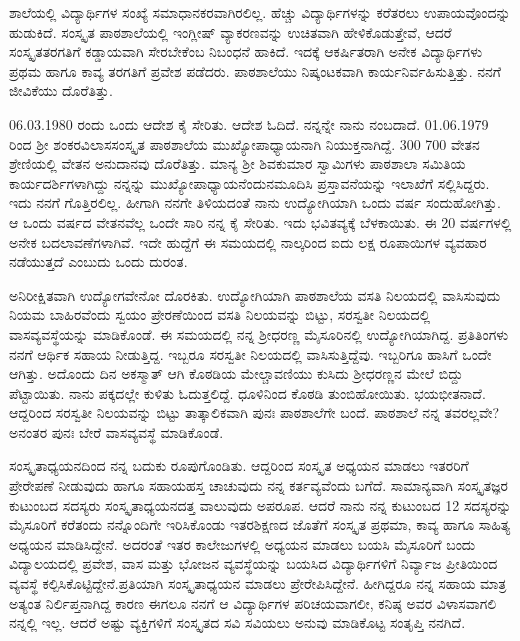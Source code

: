 {ಶಾಲೆಯಲ್ಲಿ ವಿದ್ಯಾರ್ಥಿಗಳ ಸಂಖ್ಯೆ ಸಮಾಧಾನಕರವಾಗಿರಲಿಲ್ಲ.  ಹೆಚ್ಚು ವಿದ್ಯಾರ್ಥಿ\-ಗಳನ್ನು ಕರೆತರಲು ಉಪಾಯವೊಂದನ್ನು ಹುಡುಕಿದೆ.  ಸಂಸ್ಕೃತ ಪಾಠಶಾಲೆಯಲ್ಲಿ ಇಂಗ್ಲೀಷ್ ವ್ಯಾಕರಣವನ್ನು ಉಚಿತವಾಗಿ ಹೇಳಿಕೊಡುತ್ತೇವೆ, ಆದರೆ ಸಂಸ್ಕೃತ\break ತರಗತಿಗೆ ಕಡ್ಡಾಯವಾಗಿ ಸೇರಬೇಕೆಂಬ ನಿಬಂಧನೆ ಹಾಕಿದೆ.    ಇದಕ್ಕೆ ಆಕರ್ಷಿತರಾಗಿ ಅನೇಕ ವಿದ್ಯಾರ್ಥಿಗಳು ಪ್ರಥಮ ಹಾಗೂ ಕಾವ್ಯ ತರಗತಿಗೆ ಪ್ರವೇಶ ಪಡೆದರು.  ಪಾಠಶಾಲೆಯು ನಿಷ್ಕಂಟಕವಾಗಿ ಕಾರ್ಯನಿರ್ವಹಿಸುತ್ತಿತ್ತು.  ನನಗೆ ಜೀವಿಕೆಯು ದೊರೆತಿತ್ತು.  

06.03.1980 ರಂದು ಒಂದು ಆದೇಶ ಕೈ ಸೇರಿತು.  ಆದೇಶ ಓದಿದೆ.  ನನ್ನನ್ನೇ ನಾನು ನಂಬದಾದೆ.  01.06.1979 ರಿಂದ ಶ್ರೀ ಶಂಕರವಿಲಾಸಸಂಸ್ಕೃತ ಪಾಠಶಾಲೆಯ ಮುಖ್ಯೋಪಾಧ್ಯಾಯನಾಗಿ ನಿಯುಕ್ತನಾಗಿದ್ದೆ.  300  \enginline{-}  700 ವೇತನ ಶ್ರೇಣಿಯಲ್ಲಿ ವೇತನ ಅನುದಾನವು ದೊರೆತಿತ್ತು.  ಮಾನ್ಯ ಶ್ರೀ ಶಿವಕುಮಾರ ಸ್ವಾಮಿಗಳು ಪಾಠಶಾಲಾ ಸಮಿತಿಯ ಕಾರ್ಯದರ್ಶಿಗಳಾಗಿದ್ದು ನನ್ನನ್ನು ಮುಖ್ಯೋಪಾಧ್ಯಾಯನೆಂದು\break  ನಮೂದಿಸಿ ಪ್ರಸ್ತಾವನೆಯನ್ನು ಇಲಾಖೆಗೆ ಸಲ್ಲಿಸಿದ್ದರು.  ಇದು ನನಗೆ ಗೊತ್ತಿರಲಿಲ್ಲ. ಹೀಗಾಗಿ ನನಗೇ ತಿಳಿಯದಂತೆ ನಾನು ಉದ್ಯೋಗಿಯಾಗಿ ಒಂದು ವರ್ಷ ಸಂದು\break ಹೋಗಿತ್ತು.  ಆ ಒಂದು ವರ್ಷದ ವೇತನವೆಲ್ಲ ಒಂದೇ ಸಾರಿ ನನ್ನ ಕೈ ಸೇರಿತು.  ಇದು ಭವಿತವ್ಯಕ್ಕೆ ಬೆಳಕಾಯಿತು.  ಈ 20 ವರ್ಷಗಳಲ್ಲಿ ಅನೇಕ ಬದಲಾವಣೆಗಳಾಗಿವೆ.  ಇದೇ ಹುದ್ದೆಗೆ ಈ ಸಮಯದಲ್ಲಿ ನಾಲ್ಕರಿಂದ ಐದು ಲಕ್ಷ ರೂಪಾಯಿಗಳ ವ್ಯವಹಾರ ನಡೆಯುತ್ತದೆ ಎಂಬುದು ಒಂದು ದುರಂತ.  

ಅನಿರೀಕ್ಷಿತವಾಗಿ ಉದ್ಯೋಗವೇನೋ ದೊರಕಿತು.  ಉದ್ಯೋಗಿಯಾಗಿ ಪಾಠ\-\break ಶಾಲೆಯ ವಸತಿ ನಿಲಯದಲ್ಲಿ ವಾಸಿಸುವುದು ನಿಯಮ ಬಾಹಿರವೆಂದು ಸ್ವಯಂ ಪ್ರೇರಣೆಯಿಂದ ವಸತಿ ನಿಲಯವನ್ನು ಬಿಟ್ಟು, ಸರಸ್ವತೀ ನಿಲಯದಲ್ಲಿ ವಾಸವ್ಯವಸ್ಥೆಯನ್ನು ಮಾಡಿಕೊಂಡೆ. ಈ ಸಮಯದಲ್ಲಿ ನನ್ನ ಶ್ರೀಧರಣ್ಣ ಮೈಸೂರಿನಲ್ಲಿ ಉದ್ಯೋಗಿಯಾಗಿದ್ದ.  ಪ್ರತಿತಿಂಗಳು ನನಗೆ ಆರ್ಥಿಕ ಸಹಾಯ ನೀಡುತ್ತಿದ್ದ.  ಇಬ್ಬರೂ ಸರಸ್ವತೀ ನಿಲಯದಲ್ಲಿ ವಾಸಿಸುತ್ತಿದ್ದೆವು.  ಇಬ್ಬರಿಗೂ ಹಾಸಿಗೆ ಒಂದೇ ಆಗಿತ್ತು.  ಅದೊಂದು ದಿನ ಅಕಸ್ಮಾತ್ ಆಗಿ ಕೊಠಡಿಯ ಮೇಲ್ಚಾವಣಿಯು ಕುಸಿದು ಶ್ರೀಧರಣ್ಣನ ಮೇಲೆ ಬಿದ್ದು ಪೆಟ್ಟಾಯಿತು. ನಾನು ಪಕ್ಕದಲ್ಲೇ ಕುಳಿತು ಓದುತ್ತಲಿದ್ದೆ.  ಧೂಳಿನಿಂದ ಕೊಠಡಿ ತುಂಬಿಹೋಯಿತು. ಭಯಭೀತನಾದೆ. ಆದ್ದರಿಂದ ಸರಸ್ವತೀ ನಿಲಯವನ್ನು ಬಿಟ್ಟು ತಾತ್ಕಾಲಿಕವಾಗಿ ಪುನಃ ಪಾಠಶಾಲೆಗೇ ಬಂದೆ. ಪಾಠಶಾಲೆ ನನ್ನ ತವರಲ್ಲವೇ? ಅನಂತರ ಪುನಃ ಬೇರೆ ವಾಸವ್ಯವಸ್ಥೆ ಮಾಡಿಕೊಂಡೆ. 

ಸಂಸ್ಕೃತಾಧ್ಯಯನದಿಂದ ನನ್ನ ಬದುಕು ರೂಪುಗೊಂಡಿತು.  ಆದ್ದರಿಂದ ಸಂಸ್ಕೃತ ಅಧ್ಯಯನ ಮಾಡಲು ಇತರರಿಗೆ ಪ್ರೇರೇಪಣೆ ನೀಡುವುದು ಹಾಗೂ ಸಹಾಯಹಸ್ತ ಚಾಚುವುದು ನನ್ನ ಕರ್ತವ್ಯವೆಂದು ಬಗೆದೆ.  ಸಾಮಾನ್ಯವಾಗಿ  ಸಂಸ್ಕೃತಜ್ಞರ \hbox{ಕುಟುಂಬದ} ಸದಸ್ಯರು ಸಂಸ್ಕೃತಾಧ್ಯಯನದತ್ತ ವಾಲುವುದು ಅಪರೂಪ.  ಆದರೆ ನಾನು ನನ್ನ \hbox{ಕುಟುಂಬದ} 12 ಸದಸ್ಯರನ್ನು ಮೈಸೂರಿಗೆ ಕರೆತಂದು ನನ್ನೊಂದಿಗೇ ಇರಿಸಿಕೊಂಡು ಇತರ\break ಶಿಕ್ಷಣದ ಜೊತೆಗೆ ಸಂಸ್ಕೃತ ಪ್ರಥಮಾ, ಕಾವ್ಯ ಹಾಗೂ ಸಾಹಿತ್ಯ ಅಧ್ಯಯನ ಮಾಡಿಸಿದ್ದೇನೆ.  ಅದರಂತೆ ಇತರ ಕಾಲೇಜುಗಳಲ್ಲಿ ಅಧ್ಯಯನ ಮಾಡಲು ಬಯಸಿ ಮೈಸೂರಿಗೆ ಬಂದು ವಿದ್ಯಾಲಯದಲ್ಲಿ ಪ್ರವೇಶ, ವಾಸ ಮತ್ತು ಭೋಜನ ವ್ಯವಸ್ಥೆಯನ್ನು ಬಯಸಿದ ವಿದ್ಯಾರ್ಥಿಗಳಿಗೆ ನಿರ್ವ್ಯಾಜ ಪ್ರೀತಿಯಿಂದ ವ್ಯವಸ್ಥೆ ಕಲ್ಪಿಸಿಕೊಟ್ಟಿದ್ದೇನೆ.\break  ಪ್ರತಿಯಾಗಿ ಸಂಸ್ಕೃತಾಧ್ಯಯನ ಮಾಡಲು ಪ್ರೇರೇಪಿಸಿದ್ದೇನೆ.  ಹೀಗಿದ್ದರೂ ನನ್ನ ಸಹಾಯ ಮಾತ್ರ ಅತ್ಯಂತ ನಿರ್ಲಿಪ್ತನಾಗಿದ್ದ ಕಾರಣ ಈಗಲೂ ನನಗೆ ಆ ವಿದ್ಯಾರ್ಥಿಗಳ ಪರಿಚಯ\-ವಾಗಲೀ, ಕನಿಷ್ಠ ಅವರ ವಿಳಾಸ\-ವಾಗಲಿ ನನ್ನಲ್ಲಿ ಇಲ್ಲ.  ಆದರೆ ಅಷ್ಟು ವ್ಯಕ್ತಿಗಳಿಗೆ ಸಂಸ್ಕೃತದ ಸವಿ ಸವಿಯಲು ಅನುವು ಮಾಡಿಕೊಟ್ಟ ಸಂತೃಪ್ತಿ ನನಗಿದೆ.  

}
